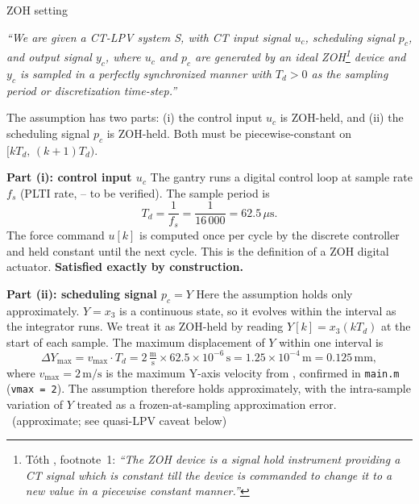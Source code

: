 \documentclass[11pt]{article}
\newcounter{assumption}
\newenvironment{assumptionenv}[1]
{
    \refstepcounter{assumption}
    \begin{assumptionbox}{#1}
}
{
    \end{assumptionbox}
}
\begin{document}
\begin{assumptionenv}{ZOH setting}
\textit{``We are given a CT-LPV system S, with CT input signal \(u_c\), scheduling signal
\(p_c\), and output signal \(y_c\), where \(u_c\) and \(p_c\) are generated by an ideal
ZOH\footnote{Tóth \cite{toth2010}, footnote~1: \textit{``The ZOH device is a signal hold
instrument providing a CT signal which is constant till the device is commanded to change it
to a new value in a piecewise constant manner.''}}
device and \(y_c\) is sampled in a perfectly synchronized manner with \(T_d > 0\) as the
sampling period or discretization time-step.''}

\medskip
The assumption has two parts: (i) the control input \(u_c\) is ZOH-held, and (ii) the
scheduling signal \(p_c\) is ZOH-held. Both must be piecewise-constant on
\([kT_d,\,(k+1)T_d)\).

\medskip
\textbf{Part (i): control input \(u_c\)}
The gantry runs a digital control loop at sample rate \(f_s\) (PLTI rate,
\cite{etel_accuret} -- to be verified). The sample period is
\[
    T_d = \frac{1}{f_s} = \frac{1}{16\,000} = 62.5\,\mu\text{s}.
\]
The force command \(u[k]\) is computed once per cycle by the discrete controller and held
constant until the next cycle. This is the definition of a ZOH digital actuator.
\textbf{Satisfied exactly by construction.} \checkmark

\medskip
\textbf{Part (ii): scheduling signal \(p_c = Y\)}
Here the assumption holds only approximately. \(Y = x_3\) is a continuous state, so it
evolves within the interval as the integrator runs. We treat it as ZOH-held by reading
\(Y[k] = x_3(kT_d)\) at the start of each sample. The maximum displacement of \(Y\)
within one interval is
\[
    \Delta Y_{\max} = v_{\max} \cdot T_d
    = 2\,\tfrac{\text{m}}{\text{s}} \times 62.5 \times 10^{-6}\,\text{s}
    = 1.25 \times 10^{-4}\,\text{m}
    = 0.125\,\text{mm},
\]
where \(v_{\max} = 2\,\text{m/s}\) is the maximum Y-axis velocity from \cite{etel_accuret},
confirmed in \texttt{main.m} (\texttt{vmax = 2}). The assumption therefore holds
approximately, with the intra-sample variation of \(Y\) treated as a frozen-at-sampling
approximation error. \checkmark\ (approximate; see quasi-LPV caveat below)
\end{assumptionenv}

\vspace{0.5em}
\end{document}
